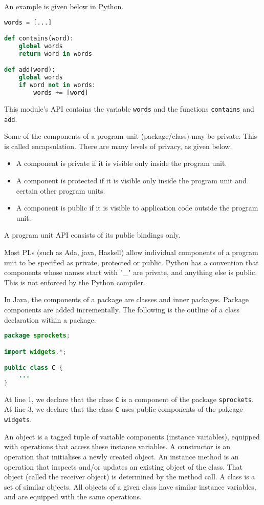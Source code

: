 \documentclass[a4paper, openany]{memoir}
\begin{document}
An example is given below in Python.
\begin{lstlisting}[language=python]
words = [...]

def contains(word):
    global words
    return word in words

def add(word):
    global words
    if word not in words:
        words += [word]
\end{lstlisting}
This module's API contains the variable \texttt{words} and the functions \texttt{contains} and \texttt{add}.

Some of the components of a program unit (package/class) may be private. This is called encapsulation. There are many levels of privacy, as given below.
\begin{itemize}
    \item A component is private if it is visible only inside the program unit.
    \item A component is protected if it is visible only inside the program unit and certain other program units.
    \item A component is public if it is visible to application code outside the program unit.
\end{itemize}
A program unit API consists of its public bindings only.

Most PLs (such as Ada, java, Haskell) allow individual components of a program unit to be specified as private, protected or public. Python has a convention that components whose names start with "\_" are private, and anything else is public. This is not enforced by the Python compiler.

In Java, the components of a package are classes and inner packages. Package components are added incrementally. The following is the outline of a class declaration within a package.
\begin{lstlisting}[language=java]
package sprockets;

import widgets.*;

public class C {
    ...
}
\end{lstlisting}
At line 1, we declare that the class \texttt{C} is a component of the package \texttt{sprockets}. At line 3, we declare that the class \texttt{C} uses public components of the pakcage \texttt{widgets}.

An object is a tagged tuple of variable components (instance variables), equipped with operations that access these instance variables. A constructor is an operation that initialises a newly created object. An instance method is an operation that inspects and/or updates an existing object of the class. That object (called the receiver object) is determined by the method call. A class is a set of similar objects. All objects of a given class have similar instance variables, and are equipped with the same operations.
\end{document}
